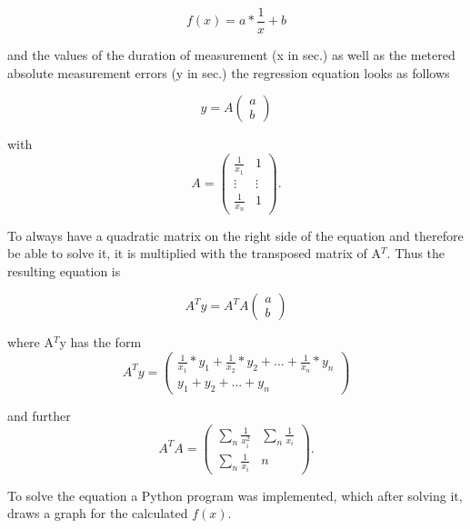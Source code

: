 \documentclass[12pt, a4paper]{report}
\begin{document}
          \begin{displaymath}
      f(x)= a*\frac{1}{x}+ b
     \end{displaymath}
     
     and the values of the duration of measurement (x in sec.) as well as the metered absolute measurement errors (y in sec.) the regression equation looks as follows
     
\begin{equation}
y = A
\begin{pmatrix}
a \\ b \end{pmatrix}
 \end{equation}
 
 with 
 \begin{equation}
A = 
\begin{pmatrix}
\frac{1}{x_1} & 1\\ \vdots & \vdots \\ \frac{1}{x_n} & 1 \end{pmatrix}.
 \end{equation}
 
 To always have a quadratic matrix on the right side of the equation and therefore be able to solve it, it is multiplied with the transposed matrix of A$^T$. Thus the resulting equation is
 
 \begin{equation}
A^T y = A^T A
\begin{pmatrix}
a \\ b \end{pmatrix}
 \end{equation}
 
where A$^T$y has the form
 \begin{equation}
A^T y = 
\begin{pmatrix}
\frac{1}{x_1}*y_1 +\frac{1}{x_2}*y_2 + \ldots + \frac{1}{x_n}*y_n \\ y_1 + y_2 + \ldots + y_n \end{pmatrix}
 \end{equation}
 
 and further 
  \begin{equation}
A^T A= 
\begin{pmatrix}
\sum_n  \frac{1}{x_i^2} & \sum_{n} \frac{1}{x_i} \\ \sum_{n} \frac{1}{x_i} & n  \end{pmatrix}.
 \end{equation}
 
 To solve the equation a Python program was implemented, which after solving it, draws a graph for the calculated $f(x)$. 
 
\end{document}
